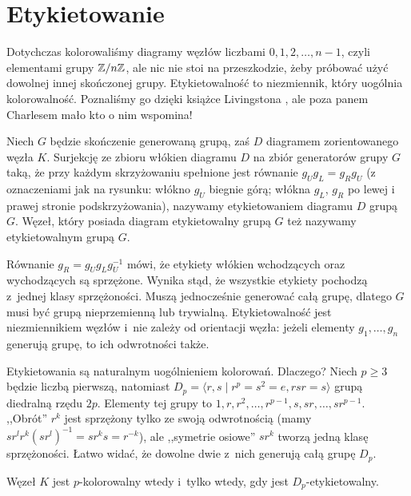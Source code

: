 
\section{Etykietowanie}

Dotychczas kolorowaliśmy diagramy węzłów liczbami $0, 1, 2, \ldots, n-1$, czyli elementami grupy $\mathbb Z/n\mathbb Z$, ale nic nie stoi na przeszkodzie, żeby próbować użyć dowolnej innej skończonej grupy.
Etykietowalność to niezmiennik, który uogólnia kolorowalność.
Poznaliśmy go dzięki książce Livingstona \cite[s. 89-99]{livingston1993}, ale poza panem Charlesem mało kto o nim wspomina!

\begin{definition}[etykietowanie]
    Niech $G$ będzie skończenie generowaną grupą, zaś $D$ diagramem zorientowanego węzła $K$.
    Surjekcję ze zbioru włókien diagramu $D$ na zbiór generatorów grupy $G$ taką, że przy każdym skrzyżowaniu spełnione jest równanie $g_Ug_L = g_Rg_U$ (z oznaczeniami jak na rysunku: włókno $g_U$ biegnie górą; włókna $g_L$, $g_R$ po lewej i prawej stronie podskrzyżowania), nazywamy etykietowaniem diagramu $D$ grupą $G$.
    Węzeł, który posiada diagram etykietowalny grupą $G$ też nazywamy etykietowalnym grupą $G$.
\begin{comment}
        \[
            \LargePlusCrossingLabel
        \]
\end{comment}
\end{definition}

Równanie $g_R = g_Ug_Lg_U^{-1}$ mówi, że etykiety włókien wchodzących oraz wychodzących są sprzężone.
Wynika stąd, że wszystkie etykiety pochodzą z~jednej klasy sprzężoności.
Muszą jednocześnie generować całą grupę, dlatego $G$ musi być grupą nieprzemienną lub trywialną.
Etykietowalność jest niezmiennikiem węzłów i~nie zależy od orientacji węzła: jeżeli elementy $g_1, \ldots, g_n$ generują grupę, to ich odwrotności także.

Etykietowania są naturalnym uogólnieniem kolorowań.
Dlaczego?
Niech $p \ge 3$ będzie liczbą pierwszą, natomiast $D_p = \langle r, s \mid r^p = s^2 = e, rsr = s \rangle$ grupą diedralną rzędu $2p$.
Elementy tej grupy to $1, r, r^2, \ldots, r^{p-1}, s, sr, \ldots, sr^{p-1}$.
,,Obrót'' $r^k$ jest sprzężony tylko ze swoją odwrotnością (mamy $sr^lr^k(sr^l)^{-1} = sr^ks = r^{-k}$), ale ,,symetrie osiowe'' $sr^k$ tworzą jedną klasę sprzężoności.
Łatwo widać, że dowolne dwie z~nich generują całą grupę $D_p$.

\begin{proposition}
    Węzeł $K$ jest $p$-kolorowalny wtedy i~tylko wtedy, gdy jest $D_p$-etykietowalny.
\end{proposition}

